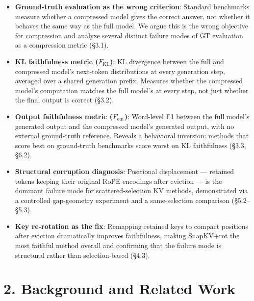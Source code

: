 \documentclass[10pt,letterpaper]{article}
\begin{document}
\begin{itemize}
\item
  \textbf{Ground-truth evaluation as the wrong criterion}: Standard
  benchmarks measure whether a compressed model gives the correct
  answer, not whether it behaves the same way as the full model. We
  argue this is the wrong objective for compression and analyze several
  distinct failure modes of GT evaluation as a compression metric
  (§3.1).
\item
  \textbf{KL faithfulness metric (\(F_{\text{KL}}\))}: KL divergence
  between the full and compressed model's next-token distributions at
  every generation step, averaged over a shared generation prefix.
  Measures whether the compressed model's computation matches the full
  model's at every step, not just whether the final output is correct
  (§3.2).
\item
  \textbf{Output faithfulness metric (\(F_{\text{out}}\))}: Word-level
  F1 between the full model's generated output and the compressed
  model's generated output, with no external ground-truth reference.
  Reveals a behavioral inversion: methods that score best on
  ground-truth benchmarks score worst on KL faithfulness (§3.3, §6.2).
\item
  \textbf{Structural corruption diagnosis}: Positional displacement ---
  retained tokens keeping their original RoPE encodings after eviction
  --- is the dominant failure mode for scattered-selection KV methods,
  demonstrated via a controlled gap-geometry experiment and a
  same-selection comparison (§5.2--§5.3).
\item
  \textbf{Key re-rotation as the fix}: Remapping retained keys to
  compact positions after eviction dramatically improves faithfulness,
  making SnapKV+rot the most faithful method overall and confirming that
  the failure mode is structural rather than selection-based (§4.3).
\end{itemize}

\hypertarget{background-and-related-work}{%
\section{2. Background and Related
Work}\label{background-and-related-work}}
\end{document}
